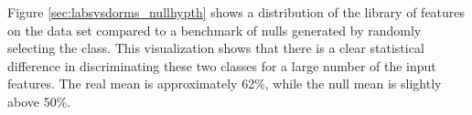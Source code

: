 Figure \ref{sec:labsvsdorms_nullhypth} shows a distribution of the library of features on the data set compared to a benchmark of nulls generated by randomly selecting the class. This visualization shows that there is a clear statistical difference in discriminating these two classes for a large number of the input features. The real mean is approximately 62\%, while the null mean is slightly above 50\%.